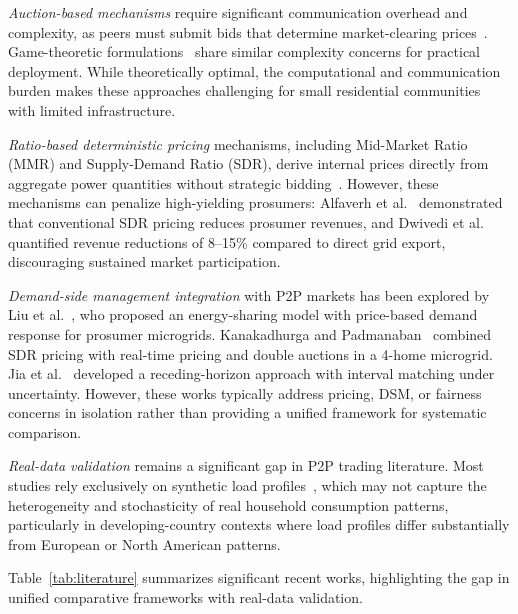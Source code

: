 \documentclass[pdflatex,sn-mathphys-num]{sn-jnl}
\theoremstyle{thmstyleone}
\theoremstyle{thmstyletwo}
\begin{document}
\textit{Auction-based mechanisms} require significant communication overhead and complexity, as peers must submit bids that determine market-clearing prices~\cite{huang2025, zhang2024}. Game-theoretic formulations~\cite{long2019, tushar2019} share similar complexity concerns for practical deployment. While theoretically optimal, the computational and communication burden makes these approaches challenging for small residential communities with limited infrastructure.

\textit{Ratio-based deterministic pricing} mechanisms, including Mid-Market Ratio (MMR) and Supply-Demand Ratio (SDR), derive internal prices directly from aggregate power quantities without strategic bidding~\cite{bogensperger2021, teotia2020}. However, these mechanisms can penalize high-yielding prosumers: Alfaverh et al.~\cite{alfaverh2023} demonstrated that conventional SDR pricing reduces prosumer revenues, and Dwivedi et al.~\cite{dwivedi2022} quantified revenue reductions of 8--15\% compared to direct grid export, discouraging sustained market participation.

\textit{Demand-side management integration} with P2P markets has been explored by Liu et al.~\cite{liu2017}, who proposed an energy-sharing model with price-based demand response for prosumer microgrids. Kanakadhurga and Padmanaban~\cite{kanakadhurga2024} combined SDR pricing with real-time pricing and double auctions in a 4-home microgrid. Jia et al.~\cite{jia2023} developed a receding-horizon approach with interval matching under uncertainty. However, these works typically address pricing, DSM, or fairness concerns in isolation rather than providing a unified framework for systematic comparison.

\textit{Real-data validation} remains a significant gap in P2P trading literature. Most studies rely exclusively on synthetic load profiles~\cite{liu2017, alfaverh2023, long2017}, which may not capture the heterogeneity and stochasticity of real household consumption patterns, particularly in developing-country contexts where load profiles differ substantially from European or North American patterns.

Table~\ref{tab:literature} summarizes significant recent works, highlighting the gap in unified comparative frameworks with real-data validation.
\end{document}
